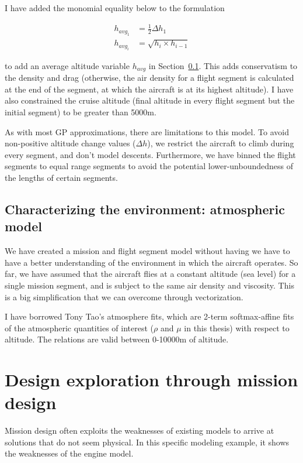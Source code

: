 I have added the monomial equality below to the formulation

\begin{align}
    h_{{avg}_1} &= \frac{1}{2}\Delta h_1 \\
    h_{{avg}_i} &= \sqrt{h_{i} \times h_{i-1}}
\end{align}

to add an average altitude variable $h_{avg}$ in Section~\ref{s:atmos}. This adds
conservatism to the density and drag (otherwise, the air density for a flight segment is calculated
at the end of the segment, at which the aircraft is at its highest altitude). I have also constrained
the cruise altitude (final altitude in every flight segment but the initial segment) to be greater than 5000m.

As with most \gls{GP} approximations, there are limitations to this model. To avoid non-positive
altitude change values ($\Delta h$), we restrict the aircraft to climb during every segment, and
don't model descents. Furthermore, we have binned the flight segments to equal range segments to
avoid the potential lower-unboundedness of the lengths of certain segments.

\subsection{Characterizing the environment: atmospheric model}
\label{s:atmos}

We have created a mission and flight segment model without having we have to have a better understanding
of the environment in which the aircraft operates. So far, we have assumed that
the aircraft flies at a constant altitude (sea level) for a single mission segment,
and is subject to the same air density and viscosity. This is a big simplification
that we can overcome through vectorization.

I have borrowed Tony Tao's atmosphere fits, which are 2-term softmax-affine fits of the atmospheric
quantities of interest ($\rho$ and $\mu$ in this thesis) with respect to altitude.
The relations are valid between 0-10000m of altitude.

\section{Design exploration through mission design}

Mission design often exploits the weaknesses of existing models to arrive at solutions
that do not seem physical. In this specific modeling example, it shows the weaknesses of the engine model.

